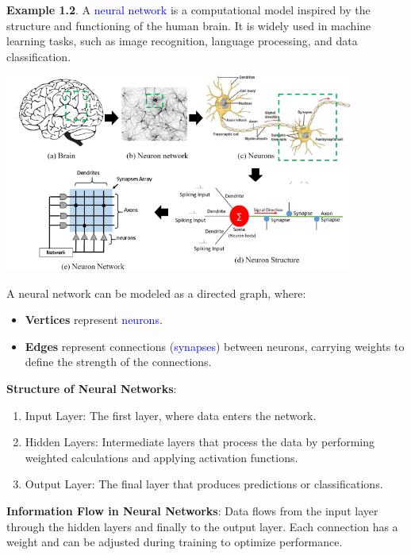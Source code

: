 \documentclass[aspectratio=169]{beamer}
\providecommand{\Blue}[1]{\textcolor{blue}{#1}}
\begin{document}
\begin{frame}[plain]{ }

{\bf Example 1.2}. %
A  \Blue{neural network} is a computational model inspired by the structure and functioning of the human brain. 
 It is widely used in machine learning tasks, such as image recognition, language processing, and data classification.
 
 \begin{center}
	      \includegraphics[height=6.5cm]{./img/lecture1-fig1-NN.png}
  \end{center}
	    
\end{frame}

\begin{frame}[plain]{}

A neural network can be modeled as a directed graph, where:
\begin{itemize}
	\item {\bf Vertices} represent \Blue{neurons}.
	\item {\bf Edges} represent connections (\Blue{synapses}) between neurons, carrying weights to define the strength of the connections.
\end{itemize}
\medskip

{\bf Structure of Neural Networks}:
  \begin{enumerate}
	\item 	Input Layer: The first layer, where data enters the network.
	\item 	Hidden Layers: Intermediate layers that process the data by performing weighted calculations and applying activation functions.
	\item 	Output Layer: The final layer that produces predictions or classifications.
 \end{enumerate}
 
{\bf Information Flow in Neural Networks}:
Data flows from the input layer through the hidden layers and finally to the output layer. 
Each connection has a weight and can be adjusted during training to optimize performance.

\end{frame}
\end{document}
